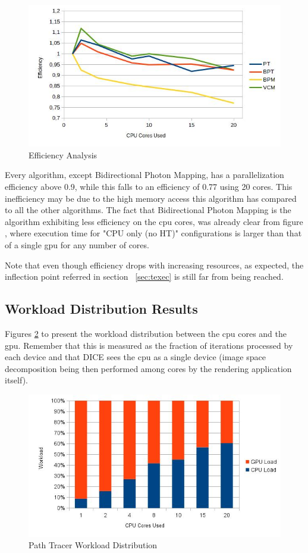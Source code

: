 \begin{figure}[H]
\centering
\includegraphics[width=0.8\linewidth]{img/efficiency.jpg}
\caption{\label{img:efficiency} Efficiency Analysis}
\end{figure}

Every algorithm, except Bidirectional Photon Mapping, has a parallelization efficiency above 0.9, while this falls to an efficiency of 0.77 using 20 cores. This inefficiency may be due to the high memory access this algorithm has compared to all the other algorithms. The fact that Bidirectional Photon Mapping is the algorithm exhibiting less efficiency on the \gls{cpu} cores, was already clear from figure \label{img:bpmTexec}, where execution time for "CPU only (no HT)" configurations is larger than that of a single \gls{gpu} for any number of cores.

Note that even though efficiency drops with increasing resources, as expected, the inflection point referred in section ~\ref{sec:texec} is still far from being reached.

\subsection{Workload Distribution Results}

Figures \ref{img:ptwl} to \label{img:ptwl} present the workload distribution between the \gls{cpu} cores and the \gls{gpu}. Remember that this is measured as the fraction of iterations processed by each device and that DICE sees the \gls{cpu} as a single device (image space decomposition being then performed among cores by the rendering application itself).

\begin{figure}[H]
\centering
\includegraphics[width=0.8\linewidth]{img/ptwl.jpg}
\caption{\label{img:ptwl} Path Tracer Workload Distribution}
\end{figure}


